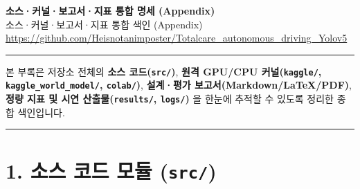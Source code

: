 \documentclass[10.5pt,a4paper]{article}
\begin{document}
\begin{center}
{\LARGE\bfseries 소스·커널·보고서·지표 통합 명세 (Appendix)}\\[6pt]
{\normalsize\color{gray} 소스·커널·보고서·지표 통합 색인 (Appendix)}\\[4pt]
{\small\href{https://github.com/Heisnotanimposter/Totalcare_autonomous_driving_Yolov5}{https://github.com/Heisnotanimposter/Totalcare\_autonomous\_driving\_Yolov5}}
\end{center}
\vspace{4pt}
\hrule
\vspace{8pt}

본 부록은 저장소 전체의 \textbf{소스 코드(\texttt{src/\allowbreak{}})}, \textbf{원격 GPU/CPU 커널(\texttt{kaggle/\allowbreak{}}, \texttt{kaggle\_\allowbreak{}world\_\allowbreak{}model/\allowbreak{}}, \texttt{colab/\allowbreak{}})}, \textbf{설계·평가 보고서(Markdown/LaTeX/PDF)}, \textbf{정량 지표 및 시연 산출물(\texttt{results/\allowbreak{}}, \texttt{logs/\allowbreak{}})} 을 한눈에 추적할 수 있도록 정리한 종합 색인입니다.


\par\noindent\rule{\textwidth}{0.4pt}\par\medskip

\section{1. 소스 코드 모듈 (\texttt{src/\allowbreak{}})}
\end{document}
